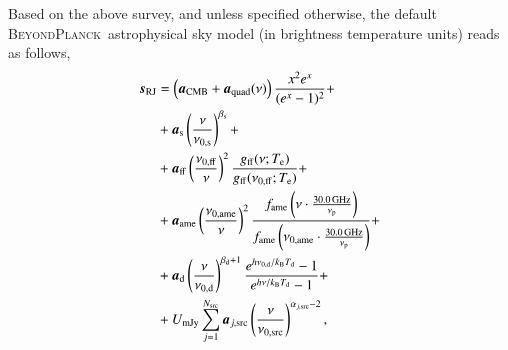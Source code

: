 \documentclass[twocolumn]{aa}
\newcommand{\s}[0]{\vec{s}}
\renewcommand{\a}[0]{\vec{a}}
\newcommand{\Te}[0]{T_{e}}
\newcommand{\BP}{\textsc{BeyondPlanck}}
\newcommand{\e}{\mathrm e}
\def\Tdust{\ifmmode T_\mathrm{d}\else $T_{\mathrm{d}}$\fi}
\def\bdust{\ifmmode \beta_\mathrm{d}\else $\beta_{\mathrm{d}}$\fi}
\def\bsynch{\ifmmode \beta_\mathrm{s}\else $\beta_{\mathrm{s}}$\fi}
\def\nuzeros{\ifmmode \nu_{0,\mathrm{s}}\else $\nu_{0,\mathrm{s}}$\fi}
\def\nuzeroff{\ifmmode \nu_{0,\mathrm{ff}}\else $\nu_{0,\mathrm{ff}}$\fi}
\def\nuzerod{\ifmmode \nu_{0,\mathrm{d}}\else $\nu_{0,\mathrm{d}}$\fi}
\def\nuzeroame{\ifmmode \nu_{0,\mathrm{ame}}\else $\nu_{0,\mathrm{ame}}$\fi}
\def\nuzerosrc{\ifmmode \nu_{0,\mathrm{src}}\else $\nu_{0,\mathrm{src}}$\fi}
\def\nup{\ifmmode \nu_{\mathrm{p}}\else $\nu_{\mathrm{p}}$\fi}
\def\Te{\ifmmode T_{\mathrm{e}}\else $T_{\mathrm{e}}$\fi}
\def\kB{\ifmmode k_\mathrm{B}\else $k_{\mathrm{B}}$\fi}
\begin{document}
Based on the above survey, and unless specified otherwise, the default
\BP\ astrophysical sky model (in brightness temperature units) reads as follows,
\begin{align}
  \vec{s}_{\mathrm{RJ}} &= \left(\vec{a}_{\mathrm{CMB}}+\vec{a}_{\mathrm{quad}}(\nu)\right) \frac{x^2 e^x}{(e^x -1)^2}+\label{eq:cmb_astsky}\\
  &+ \vec{a}_{\mathrm{s}} \left(\frac{\nu}{\nuzeros}\right)^{\bsynch} + \label{eq:synch_astsky}\\
  &+ \vec{a}_{\mathrm{ff}} \left(\frac{\nuzeroff}{\nu}\right)^2 \frac{g_{\mathrm{ff}}(\nu;\Te) }{g_{\mathrm{ff}}(\nuzeroff;\Te)} +\label{eq:ff_astsky}\\
  &+ \vec{a}_{\mathrm{ame}} \left(\frac{\nuzeroame}{\nu}\right)^2 \frac{f_{\mathrm{ame}} \left(\nu\cdot \frac{30.0\,\mathrm{GHz}}{\nup}\right)}{f_{\mathrm{ame}} \left(\nuzeroame\cdot \frac{30.0\,\mathrm{GHz}}{\nup}\right)}+\label{eq:ame_astsky}  \\ 
  &+ \vec{a}_{\mathrm{d}} \left(\frac{\nu}{\nuzerod}\right)^{\bdust+1} \frac{e^{h\nuzerod/\kB\Tdust}-1}{e^{h\nu/\kB\Tdust}-1}+ \label{eq:dust_astsky}\\
  &+ U_{\mathrm{mJy}} \sum_{j=1}^{N_{\mathrm{src}}} \vec{a}_{j,\mathrm{src}} \left(\frac{\nu}{\nuzerosrc}\right)^{\alpha_{j,\mathrm{src}}-2}, \label{eq:sum_ptsrc}
\end{align}
\end{document}
